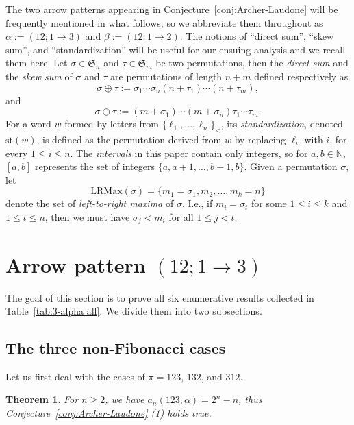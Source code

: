\documentclass[12pt]{amsart}
\numberwithin{equation}{section}
\theoremstyle{plain}
\newtheorem{theorem}{Theorem}[section]
\def\N{\mathbb{N}}
\def\fS{\mathfrak{S}}
\def\st{\mathrm{st}}
\def\LRMax{\mathrm{LRMax}}
\begin{document}
	The two arrow patterns appearing in Conjecture~\ref{conj:Archer-Laudone} will be frequently mentioned in what follows, so we abbreviate them throughout as $\alpha:=(12;1\to 3)$ and $\beta:=(12;1\to 2)$. The notions of ``direct sum'', ``skew sum'', and ``standardization'' will be useful for our ensuing analysis and we recall them here. Let $\sigma\in\fS_n$ and $\tau\in\fS_m$ be two permutations, then the \emph{direct sum} and the \emph{skew sum} of $\sigma$ and $\tau$ are permutations of length $n+m$ defined respectively as
	$$\sigma\oplus\tau := \sigma_1\cdots\sigma_n(n+\tau_1)\cdots(n+\tau_m),$$
	and
	$$\sigma\ominus\tau := (m+\sigma_1)\cdots (m+\sigma_n)\tau_1\cdots\tau_m.$$
	For a word $w$ formed by letters from $\{\ell_1,\ldots,\ell_n\}_{<}$, its \emph{standardization}, denoted $\st(w)$, is defined as the permutation derived from $w$ by replacing $\ell_i$ with $i$, for every $1\le i\le n$. The \emph{intervals} in this paper contain only integers, so for $a,b\in\N$, $[a,b]$ represents the set of integers $\{a,a+1,\ldots,b-1,b\}$. Given a permutation $\sigma$, let 
	$$\LRMax(\sigma)=\{m_1=\sigma_1,m_2,\ldots,m_k=n\}$$ 
	denote the set of \emph{left-to-right maxima} of $\sigma$. I.e., if $m_i=\sigma_t$ for some $1\le i\le k$ and $1\le t\le n$, then we must have $\sigma_j<m_i$ for all $1\le j< t$. 
	


\section{Arrow pattern \texorpdfstring{$(12;1\to 3)$}{alpha}}\label{sec:alpha}
The goal of this section is to prove all six enumerative results collected in Table~\ref{tab:3-alpha all}. We divide them into two subsections.

\subsection{The three non-Fibonacci cases}
Let us first deal with the cases of $\pi=123$, $132$, and $312$.

\begin{theorem}\label{thm:123-alpha}
For $n\ge 2$, we have $a_n(123,\alpha)=2^n-n$, thus Conjecture~\ref{conj:Archer-Laudone} (1) holds true.
\end{theorem}
\end{document}
